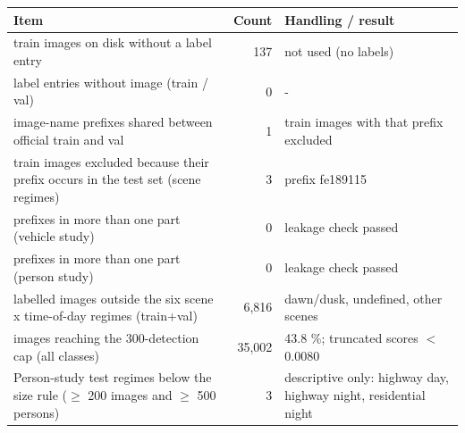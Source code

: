 \begin{tabular}{p{}rp{}}
\toprule
Item & Count & Handling / result \\
\midrule
train images on disk without a label entry & 137 & not used (no labels) \\
label entries without image (train / val) & 0 & - \\
image-name prefixes shared between official train and val & 1 & train images with that prefix excluded \\
train images excluded because their prefix occurs in the test set (scene regimes) & 3 & prefix fe189115 \\
prefixes in more than one part (vehicle study) & 0 & leakage check passed \\
prefixes in more than one part (person study) & 0 & leakage check passed \\
labelled images outside the six scene x time-of-day regimes (train+val) & 6,816 & dawn/dusk, undefined, other scenes \\
images reaching the 300-detection cap (all classes) & 35,002 & 43.8 \%; truncated scores $<$ 0.0080 \\
Person-study test regimes below the size rule ($\geq$ 200 images and $\geq$ 500 persons) & 3 & descriptive only: highway day, highway night, residential night \\
\bottomrule
\end{tabular}
